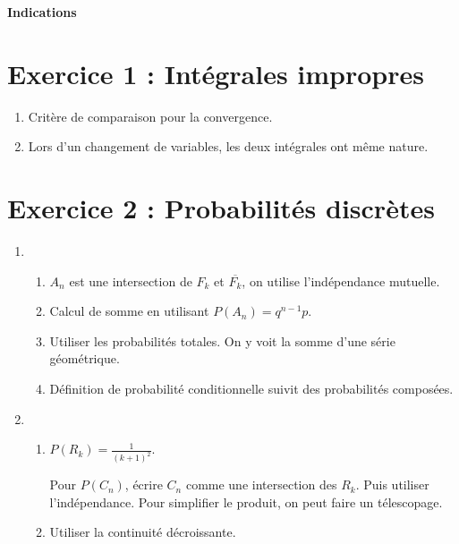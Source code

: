 \documentclass[twoside,french,11pt]{VcCours}
\begin{document}

\begin{center}
\textbf{\Large Indications}
\end{center}

\separationTitre

\section*{Exercice 1 : Intégrales impropres}
\begin{enumerate}
  \item Critère de comparaison pour la convergence.
  \item Lors d'un changement de variables, les deux intégrales ont même nature.
\end{enumerate}

\section*{Exercice 2 : Probabilités discrètes}
\begin{enumerate}
  \item \begin{enumerate}
          \item $A_n$ est une intersection de $F_k$ et $\overline{F_k}$, on utilise l'indépendance mutuelle.
          \item Calcul de somme en utilisant $P(A_n)=q^{n-1}p$.
          \item Utiliser les probabilités totales. On y voit la somme d'une série géométrique.
          \item Définition de probabilité conditionnelle suivit des probabilités composées.
        \end{enumerate}
  \item \begin{enumerate}
          \item $P(R_k)=\frac{1}{(k+1)^2}$.
          
                Pour $P(C_n)$, écrire $C_n$ comme une intersection des $R_k$.
                Puis utiliser l'indépendance. Pour simplifier le produit, on peut faire un télescopage.
          \item Utiliser la continuité décroissante.
        \end{enumerate}
      \end{enumerate}
\end{document}
